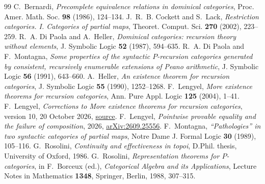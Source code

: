 \documentclass[11pt]{article}
\begin{document}
\begin{thebibliography}{99}
C.~Bernardi, \emph{Precomplete equivalence relations in dominical
categories}, Proc. Amer. Math. Soc. \textbf{98} (1986), 124--134.
J.~R.~B. Cockett and S.~Lack, \emph{Restriction categories. I.
Categories of partial maps}, Theoret. Comput. Sci. \textbf{270}
(2002), 223--259.
R.~A. Di Paola and A.~Heller, \emph{Dominical categories:
recursion theory without elements}, J. Symbolic Logic
\textbf{52} (1987), 594--635.
R.~A. Di Paola and F.~Montagna, \emph{Some properties of the syntactic
$P$-recursion categories generated by consistent, recursively enumerable
extensions of Peano arithmetic}, J. Symbolic Logic \textbf{56} (1991),
643--660.
A.~Heller, \emph{An existence theorem for recursion categories},
J. Symbolic Logic \textbf{55} (1990), 1252--1268.
F.~Lengyel, \emph{More existence theorems for recursion categories},
Ann. Pure Appl. Logic \textbf{125} (2004), 1--41.
F.~Lengyel, \emph{Corrections to More existence theorems for recursion
categories}, version 10, 20 October 2026,
\href{https://github.com/flengyel/errata/blob/5555e4fa1da7b8e3a0836dd1fbf1ca385cacd03b/lengyel2004/lengyel2004_repairs_v10.tex}{source}.
F.~Lengyel, \emph{Pointwise provable equality and the failure of
composition}, 2026,
\href{https://arxiv.org/abs/2609.25556}{arXiv:2609.25556}.
F.~Montagna, \emph{``Pathologies'' in two syntactic categories of partial
maps}, Notre Dame J. Formal Logic \textbf{30} (1989), 105--116.
G.~Rosolini, \emph{Continuity and effectiveness in topoi}, D.Phil.
thesis, University of Oxford, 1986.
G.~Rosolini, \emph{Representation theorems for $P$-categories},
in F.~Borceux (ed.), \emph{Categorical Algebra and its Applications},
Lecture Notes in Mathematics \textbf{1348}, Springer, Berlin, 1988,
307--315.
\end{thebibliography}
\end{document}
